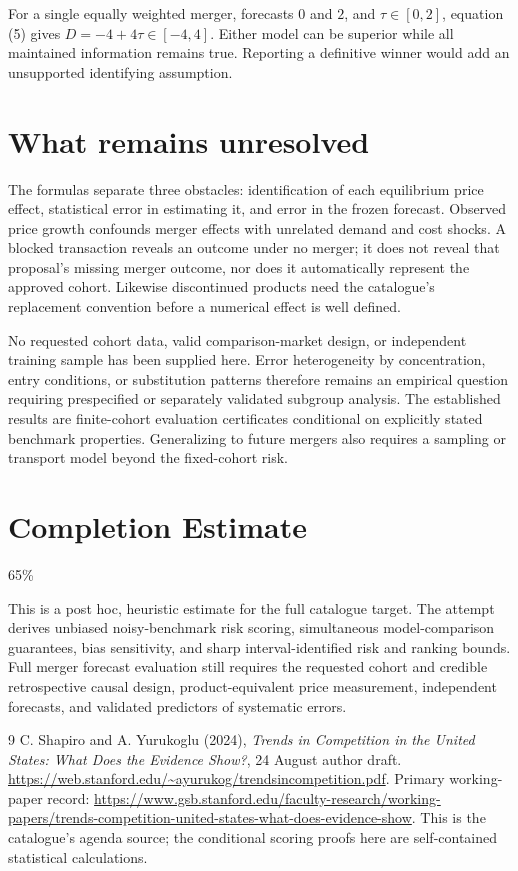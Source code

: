 \documentclass[11pt,a4paper]{article}
\begin{document}
For a single equally weighted merger, forecasts $0$ and $2$, and
$\tau\in[0,2]$, equation (5) gives $D=-4+4\tau\in[-4,4]$.
Either model can be superior while all maintained information remains true.
Reporting a definitive winner would add an unsupported identifying assumption.

\section{What remains unresolved}
The formulas separate three obstacles: identification of each equilibrium
price effect, statistical error in estimating it, and error in the frozen
forecast. Observed price growth confounds merger effects with unrelated demand
and cost shocks. A blocked transaction reveals an outcome under no merger;
it does not reveal that proposal's missing merger outcome, nor does it
automatically represent the approved cohort. Likewise discontinued products
need the catalogue's replacement convention before a numerical effect is
well defined.

No requested cohort data, valid comparison-market design, or independent
training sample has been supplied here. Error heterogeneity by concentration,
entry conditions, or substitution patterns therefore remains an empirical
question requiring prespecified or separately validated subgroup analysis.
The established results are finite-cohort evaluation certificates conditional
on explicitly stated benchmark properties. Generalizing to future mergers
also requires a sampling or transport model beyond the fixed-cohort risk.

\section{Completion Estimate}
65\%

This is a post hoc, heuristic estimate for the full catalogue target.
The attempt derives unbiased noisy-benchmark risk scoring, simultaneous model-comparison guarantees, bias sensitivity, and sharp interval-identified risk and ranking bounds. Full merger forecast evaluation still requires the requested cohort and credible retrospective causal design, product-equivalent price measurement, independent forecasts, and validated predictors of systematic errors.

\begin{thebibliography}{9}
 C. Shapiro and A. Yurukoglu (2024),
\emph{Trends in Competition in the United States: What Does the Evidence Show?},
24 August author draft.
\url{https://web.stanford.edu/~ayurukog/trendsincompetition.pdf}.
Primary working-paper record:
\url{https://www.gsb.stanford.edu/faculty-research/working-papers/trends-competition-united-states-what-does-evidence-show}.
This is the catalogue's agenda source; the conditional scoring proofs here
are self-contained statistical calculations.
\end{thebibliography}
\end{document}
